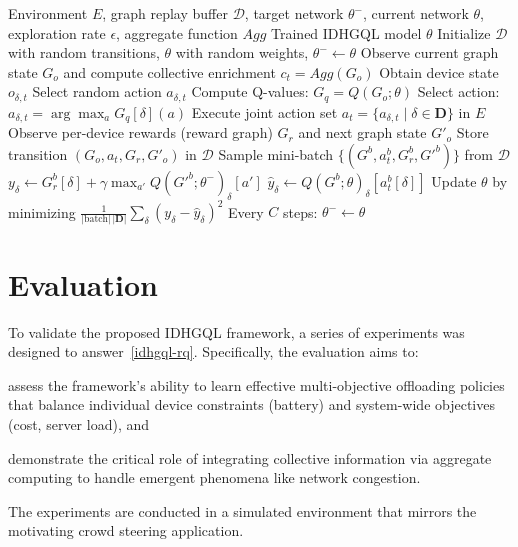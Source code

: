 \begin{algorithm}
  \caption{Informed Deep Hetero Graph Q-Learning (IDHGQL)}
  \label{alg:idhql}
  \begin{algorithmic}[1]
  \Require Environment $E$, graph replay buffer $\mathcal{D}$, target network $\theta^-$, current network $\theta$, exploration rate $\epsilon$, aggregate function $Agg$
  \Ensure Trained IDHGQL model $\theta$
  \State Initialize $\mathcal{D}$ with random transitions, $\theta$ with random weights, $\theta^- \leftarrow \theta$
      \State Observe current graph state $G_o$ and compute collective enrichment $c_t = Agg(G_o)$
          \State Obtain device state $o_{\delta,t}$
              \State Select random action $a_{\delta,t}$
          \Else
              \State Compute Q-values: $G_q = Q(G_o; \theta)$
              \State Select action: $a_{\delta,t} = \arg\max_{a} G_q[\delta](a)$
          \EndIf
      \EndFor
      \State Execute joint action set $a_t = \{a_{\delta,t} \mid \delta \in \mathbf{D}\}$ in $E$
      \State Observe per-device rewards (reward graph) $G_r$ and next graph state $G'_o$
      \State Store transition $(G_o, a_t, G_r, G'_o)$ in $\mathcal{D}$
      \State Sample mini-batch $\{(G^b, a_t^b, G_r^b, G'^{b})\}$ from $\mathcal{D}$
          \State $y_\delta \leftarrow G_r^b[\delta] + \gamma \max_{a'} Q(G'^{b}; \theta^-)_\delta[a']$
          \State $\hat{y}_\delta \leftarrow Q(G^{b}; \theta)_\delta[a_t^b[\delta]]$
      \EndFor
      \State Update $\theta$ by minimizing $\frac{1}{|\text{batch}|\,|\mathbf{D}|} \sum_\delta (y_\delta - \hat{y}_\delta)^2$
      \State Every $C$ steps: $\theta^- \leftarrow \theta$
  \EndWhile
  \end{algorithmic}
\end{algorithm}


\section{Evaluation}

To validate the proposed IDHGQL framework, 
 a series of experiments was designed to answer~\ref{idhgql-rq}. 
% 
Specifically, 
 the evaluation aims to: 
\begin{enumerate*}[label=(\roman*)]
    \item assess the framework's ability to learn effective multi-objective offloading policies that balance individual device constraints (battery) and system-wide objectives (cost, server load), and
    \item demonstrate the critical role of integrating collective information via aggregate computing to handle emergent phenomena like network congestion.
\end{enumerate*}
The experiments are conducted in a simulated environment that mirrors the motivating crowd steering application.

